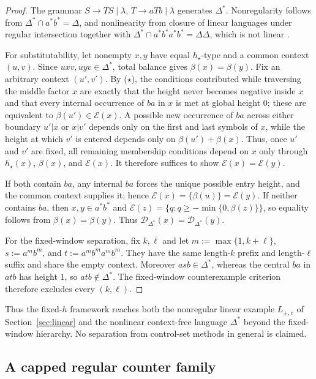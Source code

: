 \documentclass[11pt,a4paper]{article}
\theoremstyle{remark}
\theoremstyle{plain}
\newcommand{\D}{\mathcal{D}}
\begin{document}
\begin{proof}
The grammar $S\to TS\mid\lambda$, $T\to aTb\mid\lambda$ generates
$\Delta^*$.  Nonregularity follows from
$\Delta^*\cap a^*b^*=\Delta$, and nonlinearity from closure of linear
languages under regular intersection together with
$\Delta^*\cap a^*b^*a^*b^*=\Delta\Delta$, which is not linear
\cite{autebert1997}.

For substitutability, let nonempty $x,y$ have equal $h_\star$-type and a
common context $(u,v)$.  Since $uxv,uyv\in\Delta^*$, total balance gives
$\beta(x)=\beta(y)$.  Fix an arbitrary context $(u',v')$.  By
\textup{($\star$)}, the conditions contributed while traversing the middle
factor $x$ are exactly that the height never becomes negative inside $x$ and
that every internal occurrence of $ba$ in $x$ is met at global height $0$;
these are equivalent to $\beta(u')\in\mathcal E(x)$.  A possible new
occurrence of $ba$ across either boundary $u'|x$ or $x|v'$ depends only on
the first and last symbols of $x$, while the height at which $v'$ is entered
depends only on $\beta(u')+\beta(x)$.  Thus, once $u'$ and $v'$ are fixed,
all remaining membership conditions depend on $x$ only through
$h_\star(x)$, $\beta(x)$, and $\mathcal E(x)$.  It therefore suffices to
show $\mathcal E(x)=\mathcal E(y)$.

If both contain $ba$, any internal $ba$ forces the unique possible entry
height, and the common context supplies it; hence
$\mathcal E(x)=\{\beta(u)\}=\mathcal E(y)$.  If neither contains
$ba$, then $x,y\in a^*b^*$ and
$\mathcal E(z)=\{q:q\ge-\min\{0,\beta(z)\}\}$, so equality follows
from $\beta(x)=\beta(y)$.  Thus
$\D_{\Delta^*}(x)=\D_{\Delta^*}(y)$.

For the fixed-window separation, fix $k,\ell$ and let
$m:=\max\{1,k+\ell\}$,
$s:=a^mb^m$, and $t:=a^mb^ma^mb^m$.  They have the same length-$k$ prefix
and length-$\ell$ suffix and share the empty context.  Moreover
$asb\in\Delta^*$, whereas the central $ba$ in $atb$ has height $1$, so
$atb\notin\Delta^*$.  The fixed-window counterexample criterion therefore
excludes every $(k,\ell)$.
\end{proof}

Thus the fixed-$h$ framework reaches both the nonregular linear example
$L_{\pm,e}$ of Section~\ref{sec:linear} and the nonlinear context-free
language $\Delta^*$ beyond the fixed-window hierarchy.  No separation from
control-set methods in general is claimed.

\subsection{A capped regular counter family}
\end{document}
